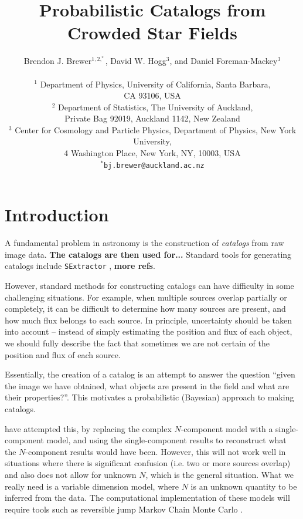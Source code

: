 \documentclass[letterpaper, 11pt]{article}
\title{Probabilistic Catalogs from Crowded Star Fields}
\author{Brendon J. Brewer$^{1, 2, ^*}$, David W. Hogg$^{3}$,
and Daniel Foreman-Mackey$^{3}$ \\
\\
\small
$^1$ Department of Physics, University of California, Santa Barbara,\\
\small
CA 93106, USA \\
\small
$^2$ Department of Statistics, The University of Auckland,\\
\small
Private Bag 92019, Auckland 1142, New Zealand \\
\small
$^3$ Center for Cosmology and Particle Physics, Department of Physics,
New York University,\\
\small
4 Washington Place, New York, NY, 10003, USA\\
\small
$^*$\texttt{bj.brewer@auckland.ac.nz}
}
\begin{document}
\maketitle

\section{Introduction}

A fundamental problem in astronomy is the construction of {\it catalogs} from
raw image data. {\bf The catalogs are then used for...}
Standard tools for generating catalogs include \texttt{SExtractor}
\citep{sextractor}, {\bf more refs}.

However, standard methods for constructing catalogs can have difficulty in some
challenging situations. For example, when multiple sources overlap partially
or completely, it can be difficult to determine how many sources are present,
and how much flux belongs to each source. In principle, uncertainty should be
taken into account -- instead of simply estimating the position and flux of each
object, we should fully describe the fact that sometimes we are not certain of
the position and flux of each source.

Essentially, the creation of a catalog is an attempt to answer the question
``given the image we have obtained, what objects are present in the field and
what are their properties?''. This motivates a probabilistic (Bayesian)
approach to making catalogs.

\citet{2011MNRAS.415.3462F} have attempted this, by replacing the complex
$N$-component model with a single-component model, and using the
single-component
results to reconstruct what the $N$-component results would have been. However,
this will not work well in situations where there is significant confusion
(i.e. two or more sources overlap) and also does not allow for unknown $N$,
which is the general situation. What we really need is a variable dimension
model, where $N$ is an unknown quantity to be inferred from the data.
The computational implementation of these models will require tools such as reversible jump Markov Chain Monte Carlo \citep{rjmcmc}.
\end{document}
